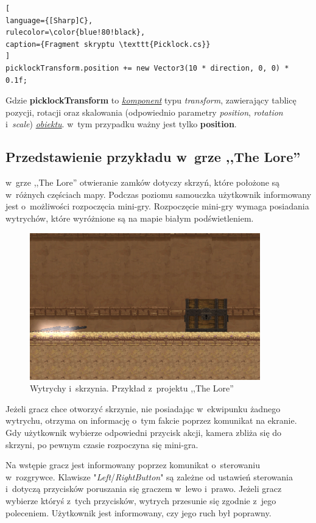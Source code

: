 \documentclass[oneside,polski,logo]{amuthesis}
\begin{document}
\begin{lstlisting}[
language={[Sharp]C},
rulecolor=\color{blue!80!black},
caption={Fragment skryptu \texttt{Picklock.cs}}
]
picklockTransform.position += new Vector3(10 * direction, 0, 0) * 0.1f;
\end{lstlisting}

Gdzie \textbf{picklockTransform} to \hyperref[sec:komponent]{\emph{komponent}} typu \emph{transform}, zawierający tablicę pozycji, rotacji oraz skalowania (odpowiednio parametry \emph{position}, \emph{rotation} i~\emph{scale}) \hyperref[sec:gameobject]{\emph{obiektu}}. w~tym przypadku ważny jest tylko \textbf{position}. 

\subsection{Przedstawienie przykładu w~grze ,,The Lore''}
w~grze ,,The Lore'' otwieranie zamków dotyczy skrzyń, które położone są w~różnych częściach mapy. Podczas poziomu samouczka użytkownik informowany jest o~możliwości rozpoczęcia mini-gry. Rozpoczęcie mini-gry wymaga posiadania wytrychów, które wyróżnione są na mapie białym podświetleniem.


\begin{figure}[h]
	\centering
	\includegraphics[width=10cm]{images/tyrek/skrzynia.png}
	\caption{Wytrychy i~skrzynia. Przykład z~projektu ,,The Lore''}
\end{figure}

Jeżeli gracz chce otworzyć skrzynie, nie posiadając w~ekwipunku żadnego wytrychu, otrzyma on informację o~tym fakcie poprzez komunikat na ekranie. Gdy użytkownik wybierze odpowiedni przycisk akcji, kamera zbliża się do skrzyni, po pewnym czasie rozpoczyna się mini-gra.

Na wstępie gracz jest informowany poprzez komunikat o~sterowaniu w~rozgrywce. Klawisze "\emph{Left}/\emph{RightButton}" są zależne od ustawień sterowania i~dotyczą przycisków poruszania się graczem w~lewo i~prawo. Jeżeli gracz wybierze któryś z~tych przycisków, wytrych przesunie się zgodnie z~jego poleceniem. Użytkownik jest informowany, czy jego ruch był poprawny.
\end{document}
